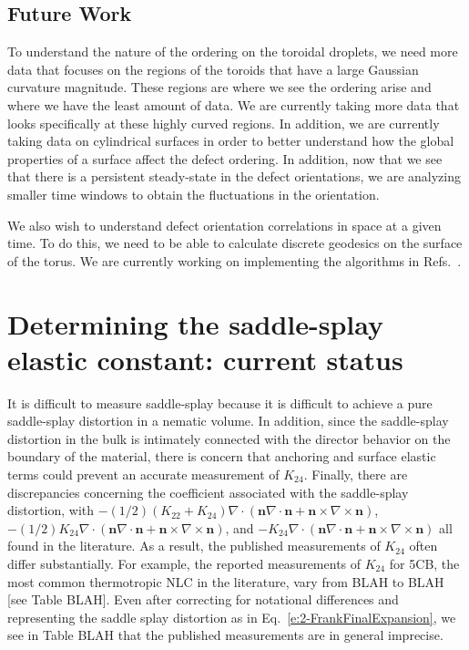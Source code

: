 \subsection{Future Work}
To understand the nature of the ordering on the toroidal droplets, we need more data that focuses on the regions of the toroids that have a large Gaussian curvature magnitude.
These regions are where we see the ordering arise and where we have the least amount of data.
We are currently taking more data that looks specifically at these highly curved regions.
In addition, we are currently taking data on cylindrical surfaces in order to better understand how the global properties of a surface affect the defect ordering.
In addition, now that we see that there is a persistent steady-state in the defect orientations, we are analyzing smaller time windows to obtain the fluctuations in the orientation.

We also wish to understand defect orientation correlations in space at a given time.
To do this, we need to be able to calculate discrete geodesics on the surface of the torus.
We are currently working on implementing the algorithms in Refs.~\cite{RN322,RN323}.



\section{Determining the saddle-splay elastic constant: current status}
It is difficult to measure saddle-splay because it is difficult to achieve a pure saddle-splay distortion in a nematic volume.
In addition, since the saddle-splay distortion in the bulk is intimately connected with the director behavior on the boundary of the material, there is concern that anchoring and surface elastic terms could prevent an accurate measurement of $K_{24}$.
Finally, there are discrepancies concerning the coefficient associated with the saddle-splay distortion, with
$-(1/2)(K_{22} + K_{24})\nabla \cdot (\mathbf{n}\nabla \cdot \mathbf{n} + \mathbf{n} \times \nabla \times \mathbf{n})$,
$-(1/2)K_{24}\nabla \cdot (\mathbf{n}\nabla \cdot \mathbf{n} + \mathbf{n} \times \nabla \times \mathbf{n})$,
and $-K_{24}\nabla \cdot (\mathbf{n}\nabla \cdot \mathbf{n} + \mathbf{n} \times \nabla \times \mathbf{n})$ all found in the literature.
As a result, the published measurements of $K_{24}$ often differ substantially.
For example, the reported measurements of $K_{24}$ for 5CB, the most common thermotropic NLC in the literature, vary from BLAH to BLAH [see Table BLAH].
Even after correcting for notational differences and representing the saddle splay distortion as in Eq.~\ref{e:2-FrankFinalExpansion}, we see in Table BLAH that the published measurements are in general imprecise.

